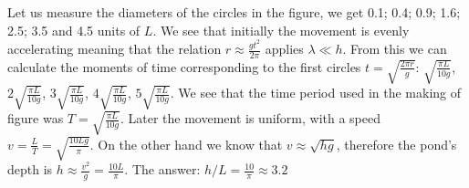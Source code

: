 \solueng
Let us measure the diameters of the circles in the figure, we get 0.1; 0.4; 0.9; 1.6; 2.5; 3.5 and 4.5 units of $L$. We see that initially the movement is evenly accelerating meaning that the relation $r \approx \frac{gt^2}{2 \pi}$ applies $\lambda \ll h$. From this we can calculate the moments of time corresponding to the first circles $t = \sqrt{\frac{2 \pi r}{g}}$: $\sqrt{\frac{\pi L}{10 g}}$, $2 \sqrt{\frac{\pi L}{10 g}}$, $3 \sqrt{\frac{\pi L}{10 g}}$, $4 \sqrt{\frac{\pi L}{10 g}}$, $5 \sqrt{\frac{\pi L}{10 g}}$. We see that the time period used in the making of figure was $T=\sqrt{\frac{\pi L}{10 g}}$. Later the movement is uniform, with a speed $v=\frac{L}{T}=\sqrt{\frac{10 L g}{\pi}}$. On the other hand we know that $v \approx \sqrt{hg}$, therefore the pond's depth is $h \approx \frac{v^2}{g} = \frac{10 L}{\pi}$. The answer: $h/L = \frac{10}{\pi} \approx \SI{3,2}{}$
\probend